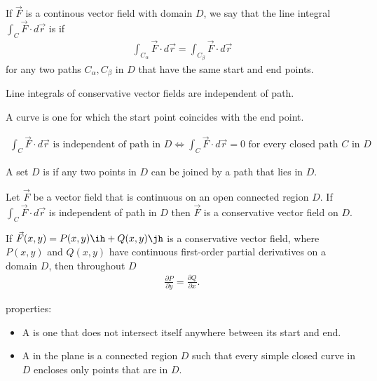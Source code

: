 \documentclass{article}
\begin{document}
\begin{definition}
    If $\vec F$ is a continous vector field with domain $D$, we say that the
    line integral $\int_C\vec F\cdot d\vec r$ is
     if
    \begin{align*}
        \int_{C_\alpha} \vec F\cdot d\vec r = \int_{C_\beta}\vec F\cdot d\vec r
    \end{align*}
    for any two paths $C_\alpha, C_\beta$ in $D$ that have the same start and
    end points.
\end{definition}
\begin{theorem}
    Line integrals of conservative vector fields are independent of path.
\end{theorem}
\begin{definition}
    A  curve is one for which the start point coincides with the end point.
\end{definition}
\begin{theorem}
    \begin{align*}
        \int_C \vec F\cdot d\vec r \text{ is independent of path in $D$}
        \Leftrightarrow
        \int_C \vec F\cdot d\vec r = 0 \text{ for every closed path $C$ in $D$}
    \end{align*}
\end{theorem}
\begin{definition}
    A set $D$ is  if any two points in $D$ can be joined by a
    path that lies in $D$.
\end{definition}
\begin{theorem}
    Let $\vec F$ be a vector field that is continuous on an open connected
    region $D$. If $\int_C\vec F\cdot d\vec r$ is independent of path in $D$
    then $\vec F$ is a conservative vector field on $D$.
\end{theorem}
\begin{theorem}
    If $\vec F(x,y) = P(x,y)\ih + Q(x,y)\jh$ is a conservative vector field,
    where $P(x,y)$ and $Q(x,y)$ have continuous first-order partial derivatives
    on a domain $D$, then throughout $D$
    \begin{align*}
        \frac{\partial P}{\partial y}=\frac{\partial Q}{\partial x}.
    \end{align*}
\end{theorem}
\begin{definition}
     properties:
    \begin{itemize}
        \item A  is one that does not intersect itself anywhere
              between its start and end.
        \item A  in the plane is a connected region $D$
              such that every simple closed curve in $D$ encloses only points that 
              are in $D$.
    \end{itemize}
\end{definition}
\end{document}
